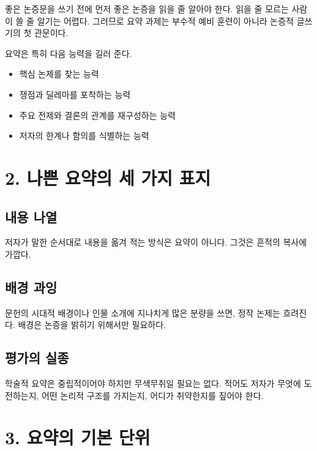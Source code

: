 좋은 논증문을 쓰기 전에 먼저 좋은 논증을 읽을 줄 알아야 한다. 읽을 줄 모르는 사람이 쓸 줄 알기는 어렵다. 그러므로 요약 과제는 부수적 예비 훈련이 아니라 논증적 글쓰기의 첫 관문이다.

요약은 특히 다음 능력을 길러 준다.

\begin{itemize}
\tightlist
\item
  핵심 논제를 찾는 능력
\item
  쟁점과 딜레마를 포착하는 능력
\item
  주요 전제와 결론의 관계를 재구성하는 능력
\item
  저자의 한계나 함의를 식별하는 능력
\end{itemize}

\section{2. 나쁜 요약의 세 가지 표지}\label{2-uxb098uxc05c-uxc694uxc57duxc758-uxc138-uxac00uxc9c0-uxd45cuxc9c0}

\subsection{내용 나열}\label{uxb0b4uxc6a9-uxb098uxc5f4}

저자가 말한 순서대로 내용을 옮겨 적는 방식은 요약이 아니다. 그것은 흔적의 복사에 가깝다.

\subsection{배경 과잉}\label{uxbc30uxacbd-uxacfcuxc789}

문헌의 시대적 배경이나 인물 소개에 지나치게 많은 분량을 쓰면, 정작 논제는 흐려진다. 배경은 논증을 밝히기 위해서만 필요하다.

\subsection{평가의 실종}\label{uxd3c9uxac00uxc758-uxc2e4uxc885}

학술적 요약은 중립적이어야 하지만 무색무취일 필요는 없다. 적어도 저자가 무엇에 도전하는지, 어떤 논리적 구조를 가지는지, 어디가 취약한지를 짚어야 한다.

\section{3. 요약의 기본 단위}\label{3-uxc694uxc57duxc758-uxae30uxbcf8-uxb2e8uxc704}

